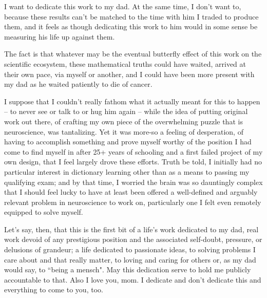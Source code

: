 \documentclass{ucbthesis}
\begin{document}
\begin{frontmatter}

\begin{dedication}
\null\vfil
I want to dedicate this work to my dad. At the same time, I don't want to, because these results can't be matched to the time with him I traded to produce them, and it feels as though dedicating this work to him would in some sense be measuring his life up against them. 

The fact is that whatever may be the eventual butterfly effect of this work on the scientific ecosystem, these mathematical truths could have waited, arrived at their own pace, via myself or another, and I could have been more present with my dad as he waited patiently to die of cancer. 

I suppose that I couldn't really fathom what it actually meant for this to happen -- to never see or talk to or hug him again -- while the idea of putting original work out there, of crafting my own piece of the overwhelming puzzle that is neuroscience, was tantalizing. Yet it was more-so a feeling of desperation, of having to accomplish something and prove myself worthy of the position I had come to find myself in after 25+ years of schooling and a first failed project of my own design, that I feel largely drove these efforts. Truth be told, I initially had no particular interest in dictionary learning other than as a means to passing my qualifying exam; and by that time, I worried the brain was so dauntingly complex that I should feel lucky to have at least been offered a well-defined and arguably relevant problem in neuroscience to work on, particularly one I felt even remotely equipped to solve myself.

Let's say, then, that this is the first bit of a life's work dedicated to my dad, real work devoid of any prestigious position and the associated self-doubt, pressure, or delusions of grandeur; a life dedicated to passionate ideas, to solving problems I care about and that really matter, to loving and caring for others or, as my dad would say, to ``being a mensch". May this dedication serve to hold me publicly accountable to that. Also I love you, mom. I dedicate and don't dedicate this and everything to come to you, too.

\vspace{12pt}
\vfil\null
\end{dedication}


\end{frontmatter}
\end{document}

